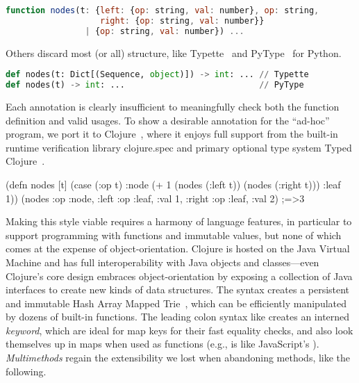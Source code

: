 \begin{lstlisting}[language=JavaScript]
function nodes(t: {left: {op: string, val: number}, op: string,
                   right: {op: string, val: number}}
                | {op: string, val: number}) ...
\end{lstlisting}

Others discard most (or all) structure, like Typette~ 
and PyType~ for Python.

\begin{lstlisting}[language=Python]
def nodes(t: Dict[(Sequence, object)]) -> int: ... // Typette
def nodes(t) -> int: ...                           // PyType
\end{lstlisting}

Each annotation is clearly insufficient to meaningfully check both the function definition
and valid usages. To show a desirable annotation for the ``ad-hoc'' program,
we port it to Clojure~, where it
enjoys full support from the built-in runtime verification library
clojure.spec and primary optional type system Typed Clojure~.

\begin{cljlisting}
(defn nodes [t] (case (:op t)
                  :node (+ 1 (nodes (:left t)) (nodes (:right t)))
                  :leaf 1))
(nodes {:op :node, :left {:op :leaf, :val 1}, :right {:op :leaf, :val 2}}) ;=>3
\end{cljlisting}

Making this style viable requires a harmony of language features, in particular to
support programming with functions and immutable values, but
none of which comes at the expense of object-orientation. Clojure is hosted on the Java Virtual Machine
and has full interoperability with Java objects and classes---even Clojure's core design embraces
object-orientation by exposing a collection of Java interfaces to create new kinds of data structures.
The  syntax creates a persistent and immutable Hash Array Mapped Trie~\cite{bagwell2001ideal},
which can be efficiently manipulated by dozens of built-in functions.
The leading colon syntax like  creates an interned \emph{keyword}, which are ideal for map keys
for their fast equality checks, and also look themselves up in maps when used as functions
(e.g.,  is like JavaScript's ).
\emph{Multimethods} regain the extensibility we lost when abandoning methods, like the following.

